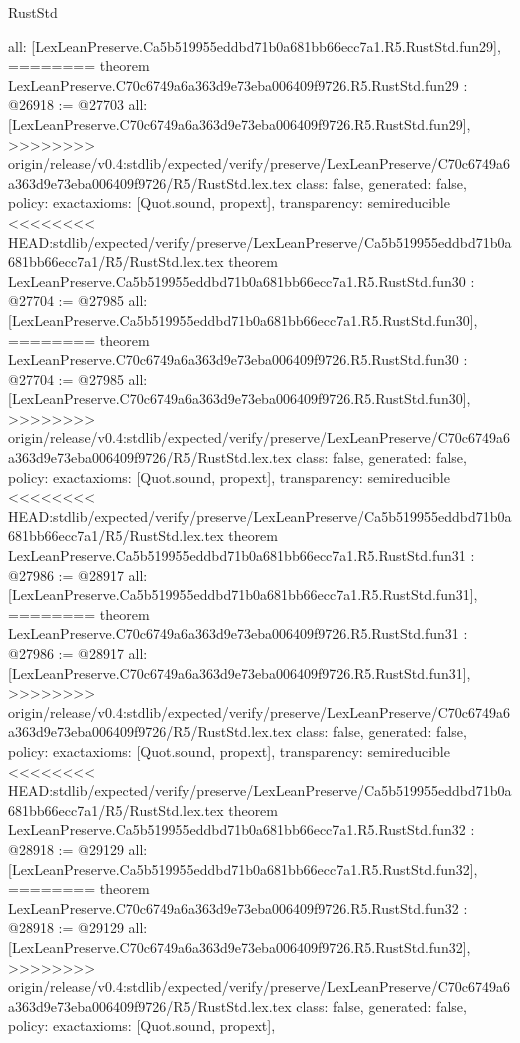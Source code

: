 \begin{lexlean}{RustStd}
\begin{coremodule}
{\begin{coremodule}
{{{{{{{{{{{{{{{{{{{{{{{{{{{{{{{{  all: [LexLeanPreserve.Ca5b519955eddbd71b0a681bb66ecc7a1.R5.RustStd.fun29],
========
theorem LexLeanPreserve.C70c6749a6a363d9e73eba006409f9726.R5.RustStd.fun29 : @26918 := @27703 {
  all: [LexLeanPreserve.C70c6749a6a363d9e73eba006409f9726.R5.RustStd.fun29],
>>>>>>>> origin/release/v0.4:stdlib/expected/verify/preserve/LexLeanPreserve/C70c6749a6a363d9e73eba006409f9726/R5/RustStd.lex.tex
  class: false,
  generated: false,
  policy: exact{axioms: [Quot.sound, propext]},
  transparency: semireducible
}
<<<<<<<< HEAD:stdlib/expected/verify/preserve/LexLeanPreserve/Ca5b519955eddbd71b0a681bb66ecc7a1/R5/RustStd.lex.tex
theorem LexLeanPreserve.Ca5b519955eddbd71b0a681bb66ecc7a1.R5.RustStd.fun30 : @27704 := @27985 {
  all: [LexLeanPreserve.Ca5b519955eddbd71b0a681bb66ecc7a1.R5.RustStd.fun30],
========
theorem LexLeanPreserve.C70c6749a6a363d9e73eba006409f9726.R5.RustStd.fun30 : @27704 := @27985 {
  all: [LexLeanPreserve.C70c6749a6a363d9e73eba006409f9726.R5.RustStd.fun30],
>>>>>>>> origin/release/v0.4:stdlib/expected/verify/preserve/LexLeanPreserve/C70c6749a6a363d9e73eba006409f9726/R5/RustStd.lex.tex
  class: false,
  generated: false,
  policy: exact{axioms: [Quot.sound, propext]},
  transparency: semireducible
}
<<<<<<<< HEAD:stdlib/expected/verify/preserve/LexLeanPreserve/Ca5b519955eddbd71b0a681bb66ecc7a1/R5/RustStd.lex.tex
theorem LexLeanPreserve.Ca5b519955eddbd71b0a681bb66ecc7a1.R5.RustStd.fun31 : @27986 := @28917 {
  all: [LexLeanPreserve.Ca5b519955eddbd71b0a681bb66ecc7a1.R5.RustStd.fun31],
========
theorem LexLeanPreserve.C70c6749a6a363d9e73eba006409f9726.R5.RustStd.fun31 : @27986 := @28917 {
  all: [LexLeanPreserve.C70c6749a6a363d9e73eba006409f9726.R5.RustStd.fun31],
>>>>>>>> origin/release/v0.4:stdlib/expected/verify/preserve/LexLeanPreserve/C70c6749a6a363d9e73eba006409f9726/R5/RustStd.lex.tex
  class: false,
  generated: false,
  policy: exact{axioms: [Quot.sound, propext]},
  transparency: semireducible
}
<<<<<<<< HEAD:stdlib/expected/verify/preserve/LexLeanPreserve/Ca5b519955eddbd71b0a681bb66ecc7a1/R5/RustStd.lex.tex
theorem LexLeanPreserve.Ca5b519955eddbd71b0a681bb66ecc7a1.R5.RustStd.fun32 : @28918 := @29129 {
  all: [LexLeanPreserve.Ca5b519955eddbd71b0a681bb66ecc7a1.R5.RustStd.fun32],
========
theorem LexLeanPreserve.C70c6749a6a363d9e73eba006409f9726.R5.RustStd.fun32 : @28918 := @29129 {
  all: [LexLeanPreserve.C70c6749a6a363d9e73eba006409f9726.R5.RustStd.fun32],
>>>>>>>> origin/release/v0.4:stdlib/expected/verify/preserve/LexLeanPreserve/C70c6749a6a363d9e73eba006409f9726/R5/RustStd.lex.tex
  class: false,
  generated: false,
  policy: exact{axioms: [Quot.sound, propext]},
}}}}}}}}}}}}}}}}}}}}}}}}}}}}}}}}}}}}
\end{coremodule}}
\end{coremodule}
\end{lexlean}
